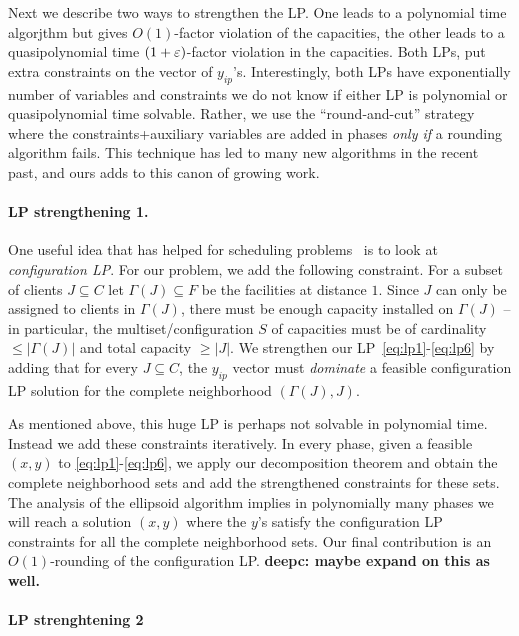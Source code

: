 \noindent
Next we describe two ways to strengthen the LP. One leads to a polynomial time algorjthm but gives $O(1)$-factor violation of the capacities, the other leads to a quasipolynomial time $(1+\varepsilon)$-factor violation in the capacities. Both LPs, put extra constraints on the vector 
of $y_{ip}$'s. Interestingly, both LPs have exponentially number of variables and constraints we do not know if either LP is polynomial or quasipolynomial time solvable. Rather, we use the ``round-and-cut'' strategy~\cite{bunch fof citations} where the constraints+auxiliary variables are added
in phases {\em only if} a rounding algorithm fails. This technique has led to many new algorithms in the recent past, and ours adds to this canon of growing work.

\paragraph{LP strengthening 1.} One useful idea that has helped for scheduling problems~\cite{bibid} is to look at {\em configuration LP}. For our problem, we add the following constraint. For a subset of clients $J\subseteq C$ let $\Gamma(J)\subseteq F$ 
be the facilities at distance $1$. Since $J$ can only be assigned to clients in $\Gamma(J)$, there must be enough capacity installed on $\Gamma(J)$ -- in particular, the multiset/configuration  $S$ of capacities must be of cardinality $\le |\Gamma(J)|$ and total capacity $\geq |J|$.
We strengthen our LP~\eqref{eq:lp1}-\eqref{eq:lp6} by adding that for every $J\subseteq C$, the $y_{ip}$ vector must {\em dominate} a feasible configuration LP solution for the complete neighborhood $(\Gamma(J),J)$. 

As mentioned above, this huge LP is perhaps not solvable in polynomial time. Instead we add these constraints iteratively. In every phase, given a feasible $(x,y)$ to \eqref{eq:lp1}-\eqref{eq:lp6}, we apply our decomposition theorem and obtain the complete neighborhood sets and add the strengthened constraints for these sets. The analysis of the ellipsoid algorithm implies in polynomially many phases we will reach a solution $(x,y)$ where the $y$'s satisfy the configuration LP constraints for all the complete neighborhood sets. 
Our final contribution is an $O(1)$-rounding of the configuration LP. {\bf deepc: maybe expand on this as well.}


\paragraph{LP strenghtening 2}


